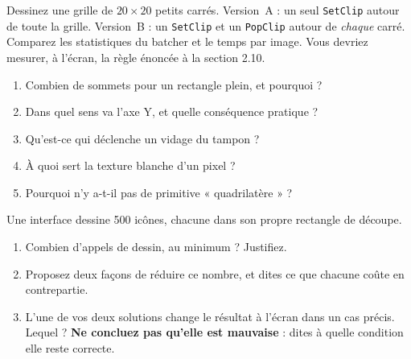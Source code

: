 \begin{nkdemo}
Dessinez une grille de $20 \times 20$ petits carrés. Version~A : un seul
\texttt{SetClip} autour de toute la grille. Version~B : un \texttt{SetClip} et un
\texttt{PopClip} autour de \emph{chaque} carré. Comparez les statistiques du
batcher et le temps par image. Vous devriez mesurer, à l'écran, la règle énoncée
à la section 2.10.
\end{nkdemo}

\begin{nkquestions}
\begin{enumerate}
\item Combien de sommets pour un rectangle plein, et pourquoi ?
\item Dans quel sens va l'axe Y, et quelle conséquence pratique ?
\item Qu'est-ce qui déclenche un vidage du tampon ?
\item À quoi sert la texture blanche d'un pixel ?
\item Pourquoi n'y a-t-il pas de primitive « quadrilatère » ?
\end{enumerate}
\end{nkquestions}

\begin{nklogique}
Une interface dessine 500 icônes, chacune dans son propre rectangle de découpe.

\begin{enumerate}
\item Combien d'appels de dessin, au minimum ? Justifiez.
\item Proposez deux façons de réduire ce nombre, et dites ce que chacune coûte
      en contrepartie.
\item L'une de vos deux solutions change le résultat à l'écran dans un cas
      précis. Lequel ? \textbf{Ne concluez pas qu'elle est mauvaise} : dites à
      quelle condition elle reste correcte.
\end{enumerate}
\end{nklogique}

